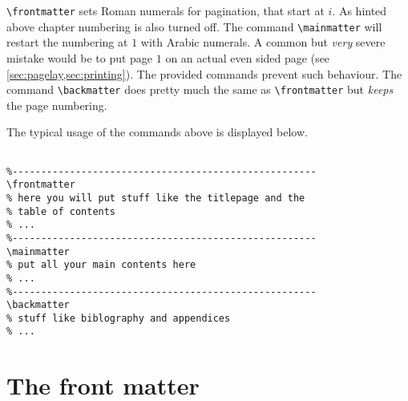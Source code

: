 \lstinline|\frontmatter| sets Roman numerals for pagination, that start at $i$. As hinted 
above chapter numbering is also turned off.
The command \lstinline|\mainmatter| will restart the numbering at $1$ with Arabic numerals. 
A common but \emph{very} severe mistake would be to put page $1$ on an actual even sided page 
(see \cref{sec:pagelay,sec:printing}). The provided commands prevent such behaviour.
The command \lstinline|\backmatter| does pretty much the same as \lstinline|\frontmatter| 
but \emph{keeps} the page numbering.
\begin{example}{}{}
The typical usage of the commands above is displayed below.
\begin{lstlisting}

%-----------------------------------------------------
\frontmatter
% here you will put stuff like the titlepage and the 
% table of contents
% ...
%-----------------------------------------------------
\mainmatter
% put all your main contents here
% ...
%-----------------------------------------------------
\backmatter
% stuff like biblography and appendices 
% ...

\end{lstlisting}	
\end{example}
\section{The front matter}\label{sec:front}
